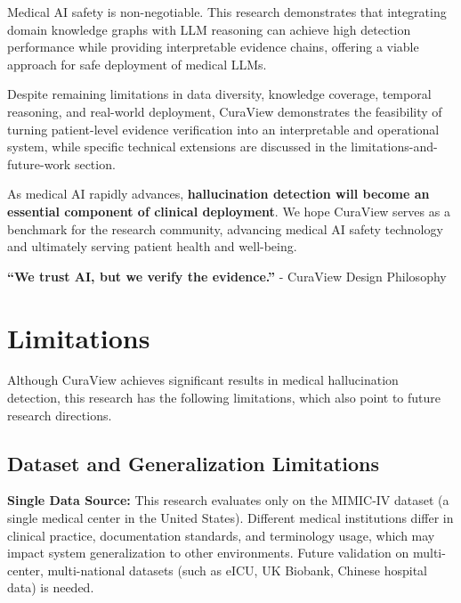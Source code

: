 \documentclass[11pt]{article}
\begin{document}
Medical AI safety is non-negotiable. This research demonstrates that integrating domain knowledge graphs with LLM reasoning can achieve high detection performance while providing interpretable evidence chains, offering a viable approach for safe deployment of medical LLMs.

Despite remaining limitations in data diversity, knowledge coverage, temporal reasoning, and real-world deployment, CuraView demonstrates the feasibility of turning patient-level evidence verification into an interpretable and operational system, while specific technical extensions are discussed in the limitations-and-future-work section.

As medical AI rapidly advances, \textbf{hallucination detection will become an essential component of clinical deployment}. We hope CuraView serves as a benchmark for the research community, advancing medical AI safety technology and ultimately serving patient health and well-being.

\textbf{``We trust AI, but we verify the evidence.''} - CuraView Design Philosophy

\section{Limitations}
Although CuraView achieves significant results in medical hallucination detection, this research has the following limitations, which also point to future research directions.

\subsection{Dataset and Generalization Limitations}

\textbf{Single Data Source:} This research evaluates only on the MIMIC-IV dataset (a single medical center in the United States). Different medical institutions differ in clinical practice, documentation standards, and terminology usage, which may impact system generalization to other environments. Future validation on multi-center, multi-national datasets (such as eICU, UK Biobank, Chinese hospital data) is needed.
\end{document}

